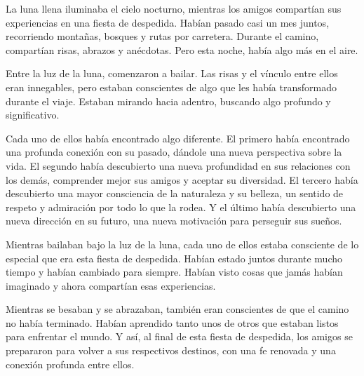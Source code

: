 

La luna llena iluminaba el cielo nocturno, mientras los amigos compartían sus experiencias en una fiesta de despedida. Habían pasado casi un mes juntos, recorriendo montañas, bosques y rutas por carretera. Durante el camino, compartían risas, abrazos y anécdotas. Pero esta noche, había algo más en el aire.

Entre la luz de la luna, comenzaron a bailar. Las risas y el vínculo entre ellos eran innegables, pero estaban conscientes de algo que les había transformado durante el viaje. Estaban mirando hacia adentro, buscando algo profundo y significativo.

Cada uno de ellos había encontrado algo diferente. El primero había encontrado una profunda conexión con su pasado, dándole una nueva perspectiva sobre la vida. El segundo había descubierto una nueva profundidad en sus relaciones con los demás, comprender mejor sus amigos y aceptar su diversidad. El tercero había descubierto una mayor consciencia de la naturaleza y su belleza, un sentido de respeto y admiración por todo lo que la rodea. Y el último había descubierto una nueva dirección en su futuro, una nueva motivación para perseguir sus sueños.

Mientras bailaban bajo la luz de la luna, cada uno de ellos estaba consciente de lo especial que era esta fiesta de despedida. Habían estado juntos durante mucho tiempo y habían cambiado para siempre. Habían visto cosas que jamás habían imaginado y ahora compartían esas experiencias.

Mientras se besaban y se abrazaban, también eran conscientes de que el camino no había terminado. Habían aprendido tanto unos de otros que estaban listos para enfrentar el mundo. Y así, al final de esta fiesta de despedida, los amigos se prepararon para volver a sus respectivos destinos, con una fe renovada y una conexión profunda entre ellos.